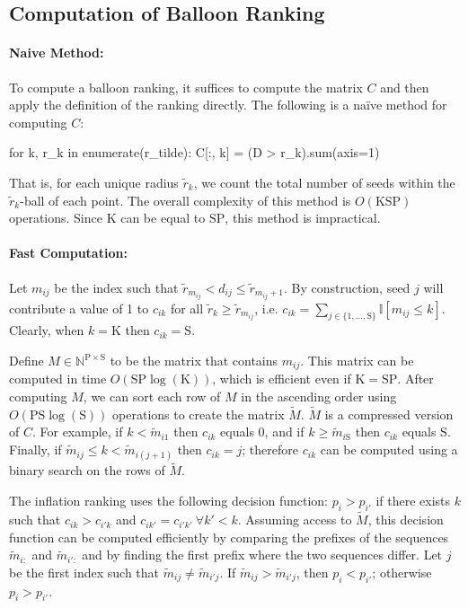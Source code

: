 \documentclass[11pt, oneside, fleqn, UTF8]{article} 	%
\theoremstyle{definition}
\newcommand{\tr}[0]{\tilde{r}}
\newcommand{\tM}[0]{\tilde{M}}
\newcommand{\tm}[0]{\tilde{m}}
\newcommand{\rmP}[0]{\mathrm{P}}
\newcommand{\rmK}[0]{\mathrm{K}}
\newcommand{\rmS}[0]{\mathrm{S}}
\begin{document}
\subsection{Computation of Balloon Ranking}
\paragraph{Naive Method:}
To compute a balloon ranking, it suffices to compute the matrix $C$ and then apply the definition of the ranking directly.  
The following is a na\"ive method for computing $C$:
\begin{python}
  for k, r_k in enumerate(r_tilde):
      C[:, k] = (D > r_k).sum(axis=1)
\end{python}
That is, for each unique radius $\tr_k$, we count the total number of seeds within the $\tr_k$-ball of each point.  The overall complexity of this method is $O(\rmK\rmS\rmP)$ operations.  Since $\rmK$ can be equal to $\mathrm{SP}$, this method is impractical.

\paragraph{Fast Computation:}
Let $m_{ij}$ be the index such that $\tr_{m_{ij}} < d_{ij} \leq \tr_{m_{ij} + 1}$.
By construction, seed $j$ will contribute a value of 1 to $c_{ik}$ for all
$\tr_k \ge \tr_{m_{ij}}$, i.e. $c_{ik}  = \sum_{j \in \{1, \ldots, \rmS\}} \mathbb{I}[m_{ij} \le k]$. Clearly, when $k=\rmK$ then $c_{ik} = \rmS$.

Define $M \in \mathbb{N}^{\rmP \times \rmS}$ to be the matrix that contains
$m_{ij}$. This matrix can be computed in time $O(\rmS\rmP\log(\rmK))$, which is efficient even if $\rmK = \rmS \rmP$. After computing $M$, we can sort each
row of $M$ in the ascending order using $O(\rmP\rmS\log(\rmS))$
operations to create the matrix $\tM$.
$\tM$ is a compressed version of $C$. For example, if $k < \tm_{i1}$
then $c_{ik}$ equals $0$, and if $k \ge \tm_{i\rmS}$ then $c_{ik}$ equals
$\rmS$. Finally, if $\tm_{ij} \le k < \tm_{i (j+1)}$ then $c_{ik} = j$; therefore
$c_{ik}$ can be computed using a binary search on the rows of $\tM$.

The inflation ranking uses the following decision function:
$p_{i} > p_{i'}$ if there exists $k$ such that $c_{ik} > c_{i'k}$ and
$c_{ik'} = c_{i'k'}\ \forall k' < k$. Assuming access to $\tM$, this
decision function can be computed efficiently by comparing the prefixes of
the sequences $\tm_{i:}$ and $\tm_{i':}$ and by finding the first prefix where
the two sequences differ. Let $j$ be the first index such
that $\tm_{ij} \ne \tm_{i'j}$. If $\tm_{ij} > \tm_{i'j}$, then $p_{i} < p_{i'}$;
otherwise $p_i > p_{i'}$.
\end{document}
